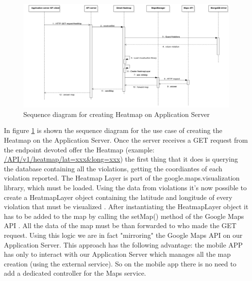 \begin{figure}[H]
\centering
\includegraphics[width=\textwidth]{Images/DDSeqSeverMap.png}
\caption{\label{fig:DDSeqSeverMap} Sequence diagram for creating Heatmap on Application Server}
\end{figure}

In figure \ref{fig:DDSeqSeverMap} is shown the sequence diagram for the use case of creating the Heatmap on the Application Server.
Once the server receives a GET request from the endpoint devoted offer the Heatmap (example: \url{/API/v1/heatmap/lat=xxx&long=xxx}) the first thing that it does is querying the database containing all the violations, getting the coordiantes of each violation reported. The Heatmap Layer is part of the \textcolor{poliblue}{google.maps.visualization} library, which must be loaded. Using the data from violations it's now possible to create a \textcolor{poliblue}{HeatmapLayer} object containing the latitude and longitude of every violation that must be visualized \cite{GMapsHeat}. After instantiating the \textcolor{poliblue}{HeatmapLayer} object it has to be added to the map by calling the \textcolor{poliblue}{setMap()} method of the Google Maps API \cite{GMapsHeat}. All the data of the map must be than forwarded to who made the GET request.
Using this logic we are in fact "mirroring" the Google Maps API on our Application Server. This approach has the following advantage: the mobile APP has only to interact with our Application Server which manages all the map creation (using the external service). So on the mobile app there is no need to add a dedicated controller for the Maps service.


